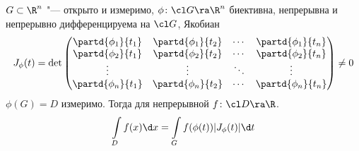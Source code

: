 \begin{theorem}
	$G \subset \R^n$ "--- открыто и измеримо,
	$\phi\colon \cl G \ra \R^n$ биективна, непрерывна и непрерывно дифференцируема на $\cl G$,
	Якобиан
	\[
		J_\phi(t) = \det
		\begin{pmatrix}
			\partd{\phi_1}{t_1} & \partd{\phi_1}{t_2} & \cdots & \partd{\phi_1}{t_n} \\
			\partd{\phi_2}{t_1} & \partd{\phi_2}{t_2} & \cdots & \partd{\phi_2}{t_n} \\
			\vdots              & \vdots              & \ddots & \vdots              \\
			\partd{\phi_n}{t_1} & \partd{\phi_n}{t_2} & \cdots & \partd{\phi_n}{t_n} \\
		\end{pmatrix} \ne 0
	\]
	$\phi(G) = D$ измеримо.
	Тогда для непрерывной $f\colon \cl D \ra \R$.
	\[
		\int\limits_D f(x) \d x = \int\limits_G f(\phi(t)) |J_\phi(t)| \d t
	\]
\end{theorem}
